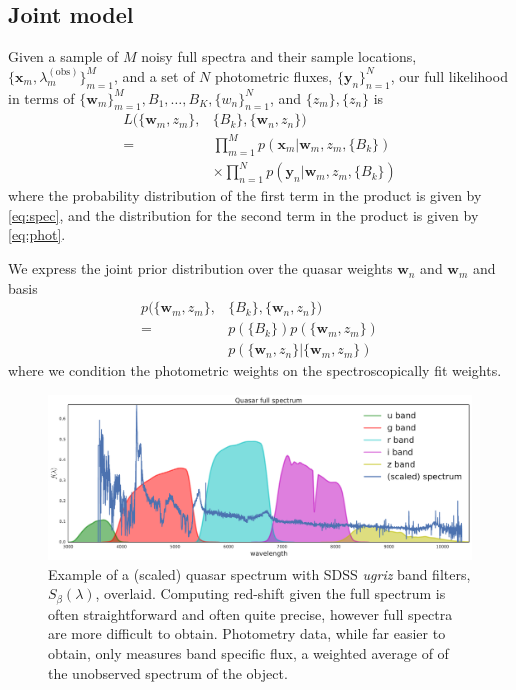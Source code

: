 \documentclass{article}
\begin{document}
\subsection{Joint model}
Given a sample of $M$ noisy full spectra and their sample locations, $\{\mathbf{x}_m, \lambda^{(\text{obs})}_m \}_{m=1}^M$, and a set of $N$ photometric fluxes, $\{\mathbf{y}_n\}_{n=1}^N$, our full likelihood in terms of $\{ \mathbf{w}_m \}_{m=1}^M, B_1, \dots, B_K, \{ w_n \}_{n=1}^N$, and $\{z_m\}, \{z_n\}$ is 
\begin{align*}
  L( \{ \mathbf{w}_m, z_m \}, &\{ B_k \}, \{ \mathbf{w}_n, z_n \} )  \\
    = & \prod_{m=1}^M p( \mathbf{x}_m | \mathbf{w}_m, z_m, \{ B_k \})  \\
      & \times \prod_{n=1}^N p( \mathbf{y}_n | \mathbf{w}_m, z_m, \{ B_k \})
\end{align*}
where the probability distribution of the first term in the product is given by \ref{eq:spec}, and the distribution for the second term in the product is given by \ref{eq:phot}.  

We express the joint prior distribution over the quasar weights $\mathbf{w}_n$ and $\mathbf{w}_m$ and basis 
\begin{align}
  p( \{ \mathbf{w}_m, z_m \}, &\{ B_k \}, \{ \mathbf{w}_n, z_n \} )  \\
    = & p(\{ B_k \}) p( \{ \mathbf{w}_m, z_m \} )  \\
      & p( \{ \mathbf{w}_n, z_n \} | \{ \mathbf{w}_m, z_m \} ) 
\end{align}
where we condition the photometric weights on the spectroscopically fit weights.  

\begin{figure}[ht]
\vskip 0.2in
\begin{center}
\centerline{\includegraphics[width=2\columnwidth]{../figs/quasar_spectrum_sdss_filters}}
\caption{Example of a (scaled) quasar spectrum with SDSS \emph{ugriz} band filters, $S_{\beta}(\lambda)$, overlaid.  Computing red-shift given the full spectrum is often straightforward and often quite precise, however full spectra are more difficult to obtain.  Photometry data, while far easier to obtain, only measures band specific flux, a weighted average of of the unobserved spectrum of the object. }
\label{fig:filters}
\end{center}
\vskip -0.2in
\end{figure} 
\end{document}
